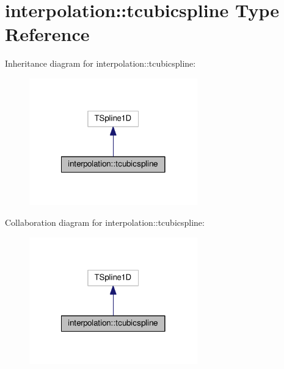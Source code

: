 \hypertarget{structinterpolation_1_1tcubicspline}{}\section{interpolation\+:\+:tcubicspline Type Reference}
\label{structinterpolation_1_1tcubicspline}


Inheritance diagram for interpolation\+:\+:tcubicspline\+:
\nopagebreak
\begin{figure}[H]
\begin{center}
\leavevmode
\includegraphics[width=206pt]{structinterpolation_1_1tcubicspline__inherit__graph}
\end{center}
\end{figure}


Collaboration diagram for interpolation\+:\+:tcubicspline\+:
\nopagebreak
\begin{figure}[H]
\begin{center}
\leavevmode
\includegraphics[width=206pt]{structinterpolation_1_1tcubicspline__coll__graph}
\end{center}
\end{figure}
